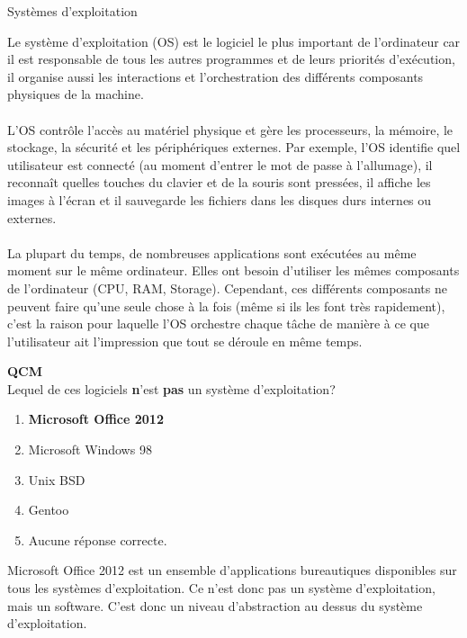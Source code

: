 \begin{section}{Systèmes d'exploitation}
    
Le système d'exploitation (OS) est le logiciel le plus important de l'ordinateur car il est responsable de tous les autres programmes et de leurs priorités d'exécution, il organise aussi les interactions et l'orchestration des différents composants physiques de la machine.
\\\\
L'OS contrôle l'accès au matériel physique et gère les processeurs, la mémoire, le stockage, la sécurité et les périphériques externes. Par exemple, l'OS identifie quel utilisateur est connecté (au moment d'entrer le mot de passe à l'allumage), il reconnaît quelles touches du clavier et de la souris sont pressées, il affiche les images à l'écran et il sauvegarde les fichiers dans les disques durs internes ou externes.
\\\\
La plupart du temps, de nombreuses applications sont exécutées au même moment sur le même ordinateur. Elles ont besoin d'utiliser les mêmes composants de l'ordinateur (CPU, RAM, Storage). Cependant, ces différents composants ne peuvent faire qu'une seule chose à la fois (même si ils les font très rapidement), c'est la raison pour laquelle l'OS orchestre chaque tâche de manière à ce que l'utilisateur ait l'impression que tout se déroule en même temps.
\\

    \begin{Exercice}[2 minutes]  \textbf{QCM}\\
    Lequel de ces logiciels \textbf{n}'est \textbf{pas} un système d'exploitation?
        \begin{enumerate}
            \item \textbf{Microsoft Office 2012}
            \item Microsoft Windows 98
            \item Unix BSD
            \item Gentoo
            \item Aucune réponse correcte.
        \end{enumerate}
    \end{Exercice}
    \begin{solution}
                Microsoft Office 2012 est un ensemble d'applications bureautiques disponibles sur tous les systèmes d'exploitation. 
		Ce n'est donc pas un système d'exploitation, mais un software. C'est donc un niveau d'abstraction au dessus du système d'exploitation.
    \end{solution}


\end{section}
